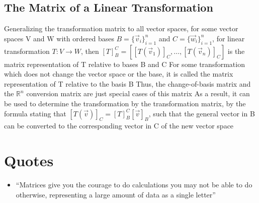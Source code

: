 \documentclass[11 pt, twoside]{article}
\newenvironment{outline*}
{
	\begin{outline}[enumerate]
	}
	{\end{outline}
}
\begin{document}
\subsection{The Matrix of a Linear Transformation}
\begin{outline*}
\1 Generalizing the transformation matrix to all vector spaces, for some vector spaces V and W with ordered bases $B = \{\vec{v}_i\}_{i=1}^n$ and $C = \{\vec{w}_i\}_{i=1}^n$, for linear transformation $T: V \to W$, then $[T]^C_B = [[T(\vec{v}_1)]_C, \dots, [T(\vec{v}_n)]_C]$ is the matrix representation of T relative to bases B and C
\2 For some transformation which does not change the vector space or the base, it is called the matrix representation of T relative to the basis B
\2 Thus, the change-of-basis matrix and the $\mathbb{R}^n$ conversion matrix are just special cases of this matrix
\2 As a result, it can be used to determine the transformation by the transformation matrix, by the formula stating that $[T(\vec{v})]_C = [T]^C_B[\vec{v}]_B$, such that the general vector in B can be converted to the corresponding vector in C of the new vector space
\1
\end{outline*}
\section{Quotes}
\begin{itemize}
\item ``Matrices give you the courage to do calculations you may not be able to do otherwise, representing a large amount of data as a single letter''
\end{itemize}
\end{document}
